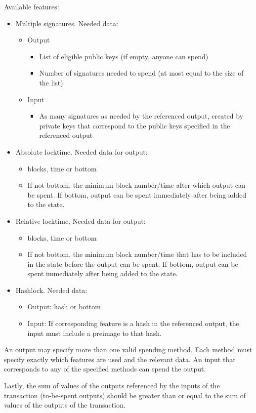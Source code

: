 Available features:
\begin{itemize}
  \item Multiple signatures. Needed data:
  \begin{itemize}
    \item Output
    \begin{itemize}
      \item List of eligible public keys (if empty, anyone can spend)
      \item Number of signatures needed to spend (at most equal to the size of the
      list)
    \end{itemize}
    \item Input
    \begin{itemize}
      \item As many signatures as needed by the referenced output, created by
      private keys that correspond to the public keys specified in the
      referenced output
    \end{itemize}
  \end{itemize}
  \item Absolute locktime. Needed data for output:
  \begin{itemize}
    \item blocks, time or bottom
    \item If not bottom, the minimum block number/time after which output can be
    spent. If bottom, output can be spent immediately after being added to the
    state.
  \end{itemize}
  \item Relative locktime. Needed data for output:
  \begin{itemize}
    \item blocks, time or bottom
    \item If not bottom, the minimum block number/time that has to be included
    in the state before the output can be spent. If bottom, output can be spent
    immediately after being added to the state.
  \end{itemize}
  \item Hashlock. Needed data:
  \begin{itemize}
    \item Output: hash or bottom
    \item Input: If corresponding feature is a hash in the referenced
    output, the input must include a preimage to that hash.
  \end{itemize}
\end{itemize}

An output may specify more than one valid spending method. Each method must
specify exactly which features are used and the relevant data. An input that
corresponds to any of the specified methods can spend the output.

Lastly, the sum of values of the outputs referenced by the inputs of the
transaction (to-be-spent outputs) should be greater than or equal to the sum of
values of the outputs of the transaction.
